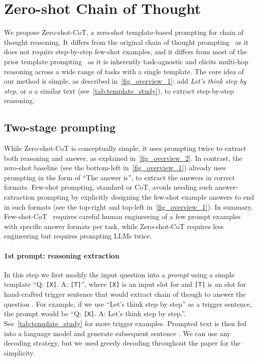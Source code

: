 \documentclass{article}
\newcommand{\CoT}{chain of thought\xspace}
\newcommand{\ours}{Zero-shot-CoT\xspace}
\newcommand{\theirs}{Few-shot-CoT\xspace}
\begin{document}
\section{Zero-shot Chain of Thought}
\label{sec:proposal}



We propose \ours, a zero-shot template-based prompting for \CoT reasoning. 
It differs from the original \CoT prompting~\citep{cot_wei} as it does not require step-by-step few-shot examples, and it differs from most of the prior template prompting~\citep{liu2021pre} as it is inherently task-agnostic and elicits multi-hop reasoning across a wide range of tasks with a single template. The core idea of our method is simple, as described in~\autoref{fig_overview_1}: add \textit{Let's think step by step}, or a a similar text (see~\autoref{tab:template_study}), to extract step-by-step reasoning.



\subsection{Two-stage prompting} 

While \ours is conceptually simple, it uses prompting twice to extract both reasoning and answer, as explained in~\autoref{fig_overview_2}. In contrast, the zero-shot baseline (see the bottom-left in~\autoref{fig_overview_1}) already uses prompting in the form of ``The answer is'', to extract the answers in correct formats. Few-shot prompting, standard or CoT, avoids needing such answer-extraction prompting by explicitly designing the few-shot example answers to end in such formats (see the top-right and top-left in~\autoref{fig_overview_1}). In summary, \theirs~\citep{cot_wei} requires careful human engineering of a few prompt examples with specific answer formats per task, while \ours requires less engineering but requires prompting LLMs twice.

\paragraph{1st prompt: reasoning extraction} In this step we first modify the input question  into a \textit{prompt}  using a simple template ``Q: \texttt{[X]}. A: \texttt{[T]}'', where \texttt{[X]} is an input slot for  and \texttt{[T]} is an slot for hand-crafted trigger sentence  that would extract chain of though to answer the question . 
For example, if we use ``Let's think step by step'' as a trigger sentence, the prompt  would be ``Q: \texttt{[X]}. A: Let's think step by step.''. 
See~\autoref{tab:template_study} for more trigger examples.
Prompted text  is then fed into a language model and generate subsequent sentence . 
We can use any decoding strategy, but we used greedy decoding throughout the paper for the simplicity. 
\end{document}
